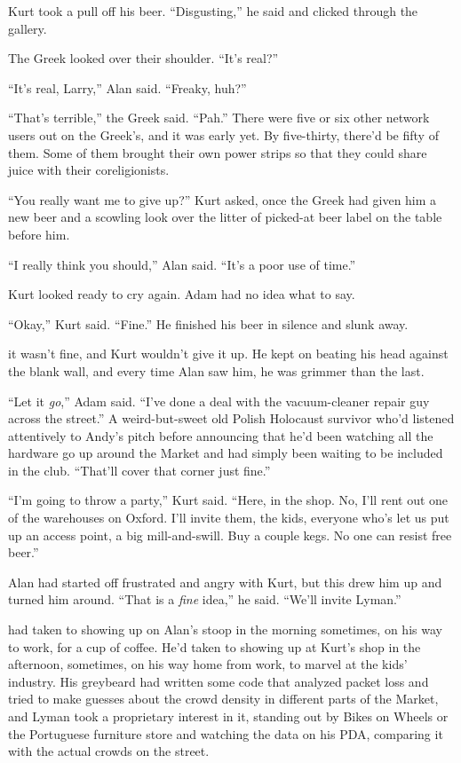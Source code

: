 Kurt took a pull off his beer.  ``Disgusting,'' he said and clicked
through the gallery.

The Greek looked over their shoulder.  ``It's real?''

``It's real, Larry,'' Alan said.  ``Freaky, huh?''

``That's terrible,'' the Greek said.  ``Pah.'' There were five or six
other network users out on the Greek's, and it was early yet.  By
five-thirty, there'd be fifty of them.  Some of them brought their own
power strips so that they could share juice with their coreligionists.

``You really want me to give up?'' Kurt asked, once the Greek had
given him a new beer and a scowling look over the litter of picked-at
beer label on the table before him.

``I really think you should,'' Alan said.  ``It's a poor use of
time.''

Kurt looked ready to cry again.  Adam had no idea what to say.

``Okay,'' Kurt said.  ``Fine.'' He finished his beer in silence and
slunk away.

 it wasn't fine, and Kurt wouldn't give it up.  He kept on beating
his head against the blank wall, and every time Alan saw him, he was
grimmer than the last.

``Let it \textit{go},'' Adam said.  ``I've done a deal with the
vacuum-cleaner repair guy across the street.'' A weird-but-sweet old
Polish Holocaust survivor who'd listened attentively to Andy's pitch
before announcing that he'd been watching all the hardware go up
around the Market and had simply been waiting to be included in the
club.  ``That'll cover that corner just fine.''

``I'm going to throw a party,'' Kurt said.  ``Here, in the shop.  No,
I'll rent out one of the warehouses on Oxford.  I'll invite them, the
kids, everyone who's let us put up an access point, a big
mill-and-swill.  Buy a couple kegs.  No one can resist free beer.''

Alan had started off frustrated and angry with Kurt, but this drew him
up and turned him around.  ``That is a \textit{fine} idea,'' he said. 
``We'll invite Lyman.''

 had taken to showing up on Alan's stoop in the morning
sometimes, on his way to work, for a cup of coffee.  He'd taken to
showing up at Kurt's shop in the afternoon, sometimes, on his way home
from work, to marvel at the kids' industry.  His greybeard had written
some code that analyzed packet loss and tried to make guesses about
the crowd density in different parts of the Market, and Lyman took a
proprietary interest in it, standing out by Bikes on Wheels or the
Portuguese furniture store and watching the data on his PDA, comparing
it with the actual crowds on the street.

